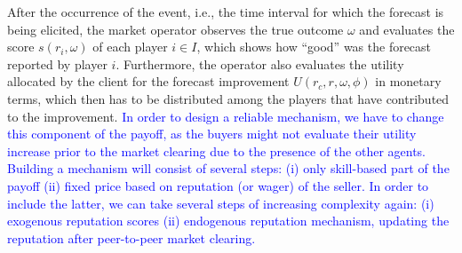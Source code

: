 \documentclass{article}
\newcommand{\tcb}{\textcolor{blue}}
\begin{document}
After the occurrence of the event, i.e., the time interval for which the forecast is being elicited, the market operator observes the true outcome $\omega$ and evaluates the score $s(r_i, \omega)$ of each player $i \in I$, which shows how ``good'' was the forecast reported by player $i$. Furthermore, the operator also evaluates the utility allocated by the client for the forecast improvement $U(r_c, r, \omega, \phi)$ in monetary terms, which then has to be distributed among the players that have contributed to the improvement. \tcb{In order to design a reliable mechanism, we have to change this component of the payoff, as the buyers might not evaluate their utility increase prior to the market clearing due to the presence of the other agents. Building a mechanism will consist of several steps: (i) only skill-based part of the payoff (ii) fixed price based on reputation (or wager) of the seller. In order to include the latter, we can take several steps of increasing complexity again: (i) exogenous reputation scores (ii) endogenous reputation mechanism, updating the reputation after peer-to-peer market clearing.}
\end{document}

